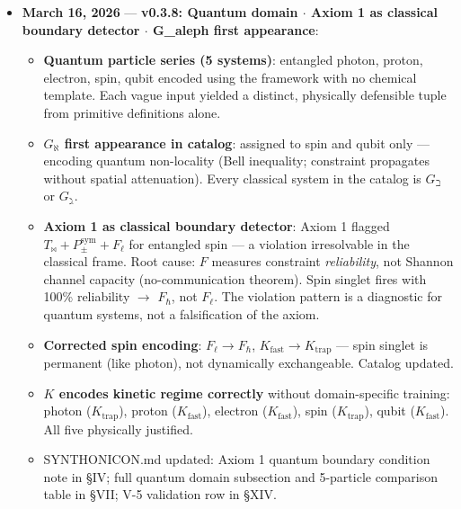 \documentclass[12pt,a4paper]{article}
\begin{document}
\begin{itemize}
\begin{itemize}
    \item \textbf{\texttt{syncon distance} command}: weighted quasi-metric with symmetric and directed (HotSwap-asymmetric) modes. Full 10$\times$10 quantum pairwise matrix computed --- proton$\leftrightarrow$electron closest (d=1.50, \textasciitilde{}0 asymmetry); proton$\leftrightarrow$spin most distant (d=6.00).
    \item \textbf{All algebra commands live in \texttt{syncon}}: \texttt{meet}, \texttt{join}, \texttt{path}, \texttt{tensor}, \texttt{lift}, \texttt{distance}, \texttt{pipeline} were registered with \texttt{main} but not \texttt{syncon\_alias} --- now wired.
\end{itemize}

    \item 
    \textbf{March 16, 2026} --- \textbf{v0.3.8: Quantum domain $\cdot$ Axiom 1 as classical boundary detector $\cdot$ G\_aleph first appearance}:

    \begin{itemize}
    \item \textbf{Quantum particle series (5 systems)}: entangled photon, proton, electron, spin, qubit encoded using the framework with no chemical template. Each vague input yielded a distinct, physically defensible tuple from primitive definitions alone.
    \item \textbf{$G_{\aleph}$ first appearance in catalog}: assigned to spin and qubit only --- encoding quantum non-locality (Bell inequality; constraint propagates without spatial attenuation). Every classical system in the catalog is $G_{\beth}$ or $G_{\gimel}$.
    \item \textbf{Axiom 1 as classical boundary detector}: Axiom 1 flagged $T_{\bowtie} + P_{\pm}^{\text{sym}} + F_{\ell}$ for entangled spin --- a violation irresolvable in the classical frame. Root cause: $F$ measures constraint \emph{reliability}, not Shannon channel capacity (no-communication theorem). Spin singlet fires with 100\% reliability $\rightarrow$ $F_{\hbar}$, not $F_{\ell}$. The violation pattern is a diagnostic for quantum systems, not a falsification of the axiom.
    \item \textbf{Corrected spin encoding}: $F_{\ell} \to F_{\hbar}$, $K_{\text{fast}} \to K_{\text{trap}}$ --- spin singlet is permanent (like photon), not dynamically exchangeable. Catalog updated.
    \item \textbf{$K$ encodes kinetic regime correctly} without domain-specific training: photon ($K_{\text{trap}}$), proton ($K_{\text{fast}}$), electron ($K_{\text{fast}}$), spin ($K_{\text{trap}}$), qubit ($K_{\text{fast}}$). All five physically justified.
    \item SYNTHONICON.md updated: Axiom 1 quantum boundary condition note in §IV; full quantum domain subsection and 5-particle comparison table in §VII; V-5 validation row in §XIV.
\end{itemize}


\end{itemize}
\end{document}
